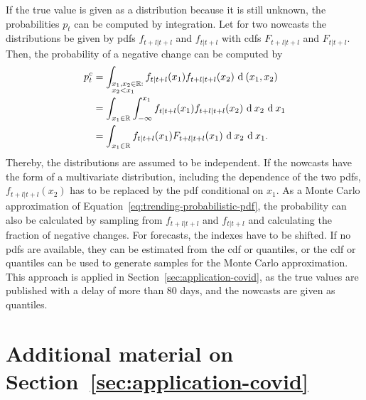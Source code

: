 \documentclass[pdflatex]{sn-jnl}
\theoremstyle{plain}%
\theoremstyle{definition}
\newcommand{\R}{\mathbb{R}}
\newcommand{\pc}{p^c}
\begin{document}
If the true value is given as a distribution because it is still unknown, the probabilities $p_t$ can be computed by integration.
Let for two nowcasts the distributions be given by \acp{pdf} $f_{t+l|t+l}$ and $f_{t|t+l}$ with \acp{cdf}  $F_{t+l|t+l}$ and $F_{t|t+l}$.
Then, the probability of a negative change can be computed by
\begin{align}
    \pc_t
        &= \int_{\begin{subarray}{l}x_1, x_2 \in \R: \\ x_2 < x_1\end{subarray}} f_{t|t+l} (x_1) f_{t+l|t+l} (x_2)  \ \textrm{d} \: (x_1, x_2) \nonumber\\
        &= \int_{x_1 \in \R} \int_{-\infty}^{x_1} f_{t|t+l} (x_1) f_{t+l|t+l} (x_2)  \ \textrm{d} \: x_2 \ \textrm{d} \: x_1 \nonumber\\
        &= \int_{x_1 \in \R} f_{t|t+l} (x_1) F_{t+l|t+l} (x_1)  \ \textrm{d} \: x_2 \ \textrm{d} \: x_1 \label{eq:trending-probabilistic-pdf}.
\end{align}
Thereby, the distributions are assumed to be independent.
If the nowcasts have the form of a multivariate distribution, including the dependence of the two \acp{pdf}, $f_{t+l|t+l} (x_2)$ has to be replaced by the \ac{pdf} conditional on $x_1$.
As a Monte Carlo approximation of Equation~\eqref{eq:trending-probabilistic-pdf}, the probability can also be calculated by sampling from $f_{t+l|t+l}$ and $f_{t|t+l}$ and calculating the fraction of negative changes.
For forecasts, the indexes have to be shifted.
If no \acp{pdf} are available, they can be estimated from the \ac{cdf} or quantiles, or the \ac{cdf} or quantiles can be used to generate samples for the Monte Carlo approximation.
This approach is applied in Section~\ref{sec:application-covid}, as the true values are published with a delay of more than 80 days, and the nowcasts are given as quantiles.


\section{Additional material on Section~\ref{sec:application-covid}}\label{sec:appendix-application-covid}
\end{document}
